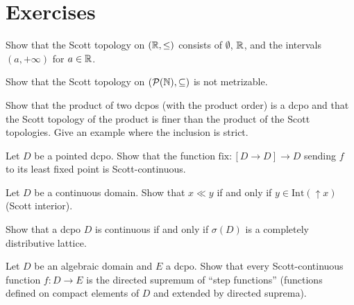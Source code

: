 \section{Exercises}

\begin{exercise}
Show that the Scott topology on $(\mathbb{R}, \leq)$ consists of $\emptyset$, $\mathbb{R}$, and the
intervals $(a, +\infty)$ for $a \in \mathbb{R}$.
\end{exercise}

\begin{exercise}
Show that the Scott topology on $(\mathcal{P}(\mathbb{N}), \subseteq)$ is not metrizable.
\end{exercise}

\begin{exercise}
Show that the product of two dcpos (with the product order) is a dcpo and that the Scott
topology of the product is finer than the product of the Scott topologies. Give an example
where the inclusion is strict.
\end{exercise}

\begin{exercise}
Let $D$ be a pointed dcpo. Show that the function $\mathrm{fix}\colon [D \to D] \to D$
sending $f$ to its least fixed point is Scott-continuous.
\end{exercise}

\begin{exercise}
Let $D$ be a continuous domain. Show that $x \ll y$ if and only if
$y \in \mathrm{Int}(\uparrow\! x)$ (Scott interior).
\end{exercise}

\begin{exercise}
Show that a dcpo $D$ is continuous if and only if $\sigma(D)$ is a completely distributive
lattice.
\end{exercise}

\begin{exercise}
Let $D$ be an algebraic domain and $E$ a dcpo. Show that every Scott-continuous function
$f\colon D \to E$ is the directed supremum of ``step functions'' (functions defined on
compact elements of $D$ and extended by directed suprema).
\end{exercise}
